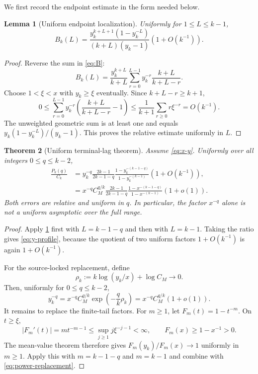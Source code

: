 \documentclass[11pt]{article}
\newtheorem{theorem}{Theorem}[section]
\newtheorem{lemma}[theorem]{Lemma}
\theoremstyle{remark}
\begin{document}
We first record the endpoint estimate in the form needed below.

\begin{lemma}[Uniform endpoint localization]\label{lem:endpoint}
Uniformly for $1\le L\le k-1$,
\begin{equation}\label{eq:endpoint}
 B_k(L)=\frac{y_k^{k+L+1}(1-y_k^{-L})}
 {(k+L)(y_k-1)}\left(1+O(k^{-1})\right).
\end{equation}
\end{lemma}

\begin{proof}
Reverse the sum in \eqref{eq:B}:
\[
 B_k(L)=\frac{y_k^{k+L}}{k+L}
 \sum_{r=0}^{L-1}y_k^{-r}\frac{k+L}{k+L-r}.
\]
Choose $1<\xi<x$ with $y_k\ge\xi$ eventually.  Since $k+L-r\ge k+1$,
\[
 0\le \sum_{r=0}^{L-1}y_k^{-r}
 \left(\frac{k+L}{k+L-r}-1\right)
 \le \frac1{k+1}\sum_{r\ge0}r\xi^{-r}=O(k^{-1}).
\]
The unweighted geometric sum is at least one and equals
$y_k(1-y_k^{-L})/(y_k-1)$.  This proves the relative estimate uniformly in
$L$.
\end{proof}

\begin{theorem}[Uniform terminal-lag theorem]\label{thm:uniform}
Assume \eqref{eq:x-y}.  Uniformly over all integers $0\le q\le k-2$,
\begin{align}
 \frac{P_k(q)}{C_k}
 &=y_k^{-q}\frac{2k-1}{2k-1-q}
 \frac{1-y_k^{-(k-1-q)}}{1-y_k^{-(k-1)}}
 \left(1+O(k^{-1})\right),\label{eq:y-profile}\\
 &=x^{-q}C_M^{q/k}\frac{2k-1}{2k-1-q}
 \frac{1-x^{-(k-1-q)}}{1-x^{-(k-1)}}
 (1+o(1)).\label{eq:x-profile}
\end{align}
Both errors are relative and uniform in $q$.  In particular, the factor
$x^{-q}$ alone is not a uniform asymptotic over the full range.
\end{theorem}

\begin{proof}
Apply \cref{lem:endpoint} first with $L=k-1-q$ and then with $L=k-1$.
Taking the ratio gives \eqref{eq:y-profile}, because the quotient of two
uniform factors $1+O(k^{-1})$ is again $1+O(k^{-1})$.

For the source-locked replacement, define
\[
 \rho_k:=k\log(y_k/x)+\log C_M\longrightarrow0.
\]
Then, uniformly for $0\le q\le k-2$,
\begin{equation}\label{eq:power-replacement}
 y_k^{-q}=x^{-q}C_M^{q/k}
 \exp\left(-\frac{q}{k}\rho_k\right)
 =x^{-q}C_M^{q/k}(1+o(1)).
\end{equation}
It remains to replace the finite-tail factors.  For $m\ge1$, let
$F_m(t)=1-t^{-m}$.  On $t\ge\xi$,
\[
 |F_m'(t)|=m t^{-m-1}\le\sup_{j\ge1}j\xi^{-j-1}<\infty,
 \qquad F_m(x)\ge1-x^{-1}>0.
\]
The mean-value theorem therefore gives $F_m(y_k)/F_m(x)\to1$ uniformly in
$m\ge1$.  Apply this with $m=k-1-q$ and $m=k-1$ and combine with
\eqref{eq:power-replacement}.
\end{proof}
\end{document}
